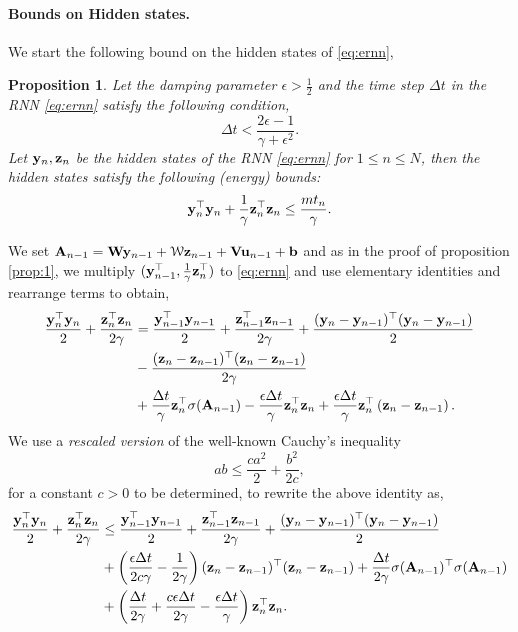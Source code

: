 \documentclass{article} \usepackage{iclr2021_conference,times}
\newtheorem{proposition}[theorem]{Proposition}
\newcommand{\cW}{\EuScript{W}}
\newcommand{\by}{{\bf y}}
\newcommand{\bz}{{\bf z}}
\newcommand{\bW}{{\bf W}}
\newcommand{\bu}{{\bf u}}
\newcommand{\bb}{{\bf b}}
\newcommand{\bV}{{\bf V}}
\newcommand{\bA}{{\bf A}}
\newcommand{\ep}{\epsilon}
\newcommand{\Dt}{{\Delta t}}
\begin{document}
\paragraph{Bounds on Hidden states.} We start the following bound on the hidden states of \eqref{eq:ernn},
\begin{proposition}
\label{prop:en1}
Let the damping parameter $\ep > \frac{1}{2}$ and the time step $\Dt$ in the RNN \eqref{eq:ernn} satisfy the following condition,
\begin{equation}
    \label{eq:ndt}
    \Dt < \frac{2\ep -1}{\gamma + \ep^2}.
\end{equation}
Let $\by_n,\bz_n$ be the hidden states of the RNN \eqref{eq:ernn} for $1\leq n \leq N$, then the hidden states satisfy the following (energy) bounds:
\begin{equation}
    \label{eq:nenb}
    \by_n^\top \by_n + \frac{1}{\gamma} \bz_n^\top \bz_n \leq \frac{m t_n}{\gamma}.
\end{equation}
\end{proposition}
We set $\bA_{n-1} = \bW \by_{n-1} + \cW \bz_{n-1} + \bV\bu_{n-1} + \bb$ and as in the proof of proposition \ref{prop:1}, we  multiply $({\by}_{n-1}^\top, \frac{1}{\gamma}{\bz}^\top_n)$ to \eqref{eq:ernn} and use elementary identities and rearrange terms to obtain,
\begin{align*}
\frac{\by_n^\top \by_n}{2} + \frac{\bz_n^\top \bz_n}{2\gamma} &= \frac{\by_{n-1}^\top \by_{n-1}}{2} + \frac{\bz_{n-1}^\top \bz_{n-1}}{2\gamma} + \frac{(\by_n- \by_{n-1})^\top (\by_n- \by_{n-1})}{2} \\
&- \frac{(\bz_n- \bz_{n-1})^\top (\bz_n- \bz_{n-1})}{2\gamma} \\
&+  \frac{\Dt}{\gamma} \bz_n^\top \sigma(\bA_{n-1}) -  \frac{\ep\Dt}{\gamma} \bz_n^\top\bz_n + \frac{\ep \Dt}{\gamma}\bz_n^{\top}\left(\bz_n-\bz_{n-1}\right).
\end{align*}
We use a \emph{rescaled version} of the well-known Cauchy's inequality 
$$
ab \leq \frac{c a^2}{2} + \frac{b^2}{2c},
$$
for a constant $c > 0$ to be determined, to rewrite the above identity as,
\begin{align*}
\frac{\by_n^\top \by_n}{2} + \frac{\bz_n^\top \bz_n}{2\gamma} &\leq \frac{\by_{n-1}^\top \by_{n-1}}{2} + \frac{\bz_{n-1}^\top \bz_{n-1}}{2\gamma} + \frac{(\by_n- \by_{n-1})^\top (\by_n- \by_{n-1})}{2} \\
&+\left(\frac{\ep \Dt}{2 c \gamma} - \frac{1}{2 \gamma}\right)(\bz_n- \bz_{n-1})^\top (\bz_n- \bz_{n-1})
+ \frac{\Dt}{2\gamma}\sigma(\bA_{n-1})^\top \sigma(\bA_{n-1}) \\
&+ \left(\frac{\Dt}{2\gamma} + \frac{c \ep \Dt}{2 \gamma} - \frac{\ep \Dt}{\gamma}\right) \bz_n^{\top}\bz_n.  
\end{align*}
\end{document}
